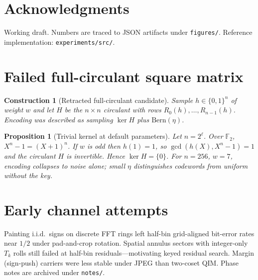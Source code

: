 \documentclass[11pt,a4paper]{article}
\newtheorem{proposition}[theorem]{Proposition}
\newtheorem{construction}[theorem]{Construction}
\newcommand{\Bern}{\mathrm{Bern}}
\begin{document}
\section*{Acknowledgments}
Working draft. Numbers are traced to JSON artifacts under \texttt{figures/}.
Reference implementation: \texttt{experiments/src/}.

\appendix
\section{Failed full-circulant square matrix}
\label{app:failed}

\begin{construction}[Retracted full-circulant candidate]
Sample \(h\in\{0,1\}^n\) of weight \(w\) and let \(H\) be the \(n\times n\) circulant
with rows \(R_0(h),\ldots,R_{n-1}(h)\).
Encoding was described as sampling \(\ker H\) plus \(\Bern(\eta)\).
\end{construction}

\begin{proposition}[Trivial kernel at default parameters]
Let \(n=2^\ell\). Over \(\mathbb{F}_2\), \(X^n-1=(X+1)^n\).
If \(w\) is odd then \(h(1)=1\), so \(\gcd(h(X),X^n-1)=1\) and the circulant \(H\) is
invertible.
Hence \(\ker H=\{0\}\).
For \(n=256\), \(w=7\), encoding collapses to noise alone; small \(\eta\) distinguishes
codewords from uniform without the key.
\end{proposition}

\section{Early channel attempts}
\label{app:channel}

Painting i.i.d.\ signs on discrete FFT rings left half-bin grid-aligned bit-error
rates near \(1/2\) under pad-and-crop rotation.
Spatial annulus sectors with integer-only \(T_k\) rolls still failed at half-bin
residuals---motivating keyed residual search.
Margin (sign-push) carriers were less stable under JPEG than two-coset QIM.
Phase notes are archived under \texttt{notes/}.



\end{document}
